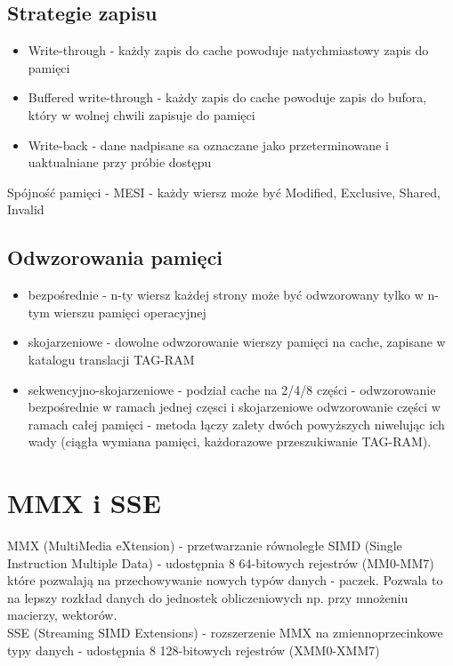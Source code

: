 \documentclass[a4paper]{article}
\begin{document}
\subsection{Strategie zapisu}
\begin{itemize}
\item Write-through - każdy zapis do cache powoduje natychmiastowy zapis do pamięci
\item Buffered write-through - każdy zapis do cache powoduje zapis do bufora, który w wolnej chwili zapisuje do pamięci
\item Write-back - dane nadpisane sa oznaczane jako przeterminowane i uaktualniane przy próbie dostępu
\end{itemize}
Spójność pamięci - MESI - każdy wiersz może być Modified, Exclusive, Shared, Invalid
\subsection{Odwzorowania pamięci}
\begin{itemize}
\item bezpośrednie - n-ty wiersz każdej strony może być odwzorowany tylko w n-tym wierszu pamięci operacyjnej
\item skojarzeniowe - dowolne odwzorowanie wierszy pamięci na cache, zapisane w katalogu translacji TAG-RAM
\item sekwencyjno-skojarzeniowe - podział cache na 2/4/8 części - odwzorowanie bezpośrednie w ramach jednej częsci i skojarzeniowe odwzorowanie części w ramach całej pamięci - metoda łączy zalety dwóch powyższych niwelując ich wady (ciągła wymiana pamięci, każdorazowe przeszukiwanie TAG-RAM).
\end{itemize}

\section{MMX i SSE}
MMX (MultiMedia eXtension) - przetwarzanie równoległe SIMD (Single Instruction Multiple Data) - udostępnia 8 64-bitowych rejestrów (MM0-MM7) które pozwalają na przechowywanie nowych typów danych - paczek. Pozwala to na lepszy rozkład danych do jednostek obliczeniowych np. przy mnożeniu macierzy, wektorów.\\
SSE (Streaming SIMD Extensions) - rozszerzenie MMX na zmiennoprzecinkowe typy danych - udostępnia 8 128-bitowych rejestrów (XMM0-XMM7)
\end{document}
